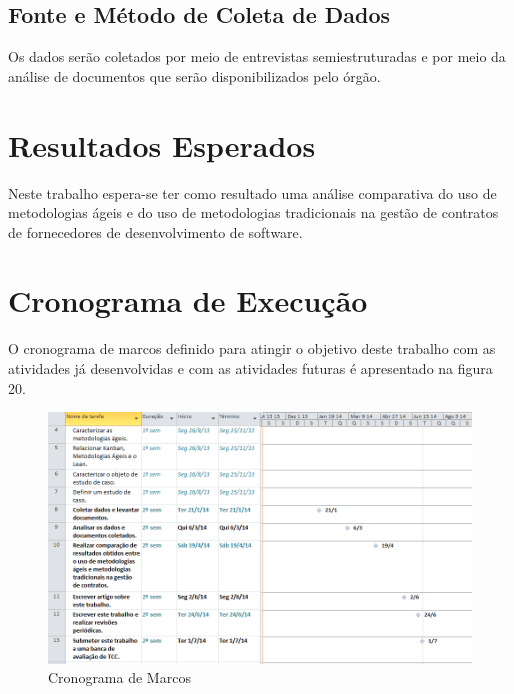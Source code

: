 \subsection[Fonte e Método Coleta de Dados]{Fonte e Método de Coleta de Dados}

Os dados serão coletados por meio de entrevistas semiestruturadas e por meio da análise de documentos que serão disponibilizados pelo órgão.

\section[Resultados Esperados]{Resultados Esperados}

Neste trabalho espera-se ter como resultado uma análise comparativa do uso de metodologias ágeis e do uso de metodologias tradicionais na gestão de contratos de fornecedores de desenvolvimento de software.

\section[Cronograma de Execução]{Cronograma de Execução}

O cronograma de marcos definido para atingir o objetivo deste trabalho com as atividades já desenvolvidas e com as atividades futuras é apresentado na figura 20.

\begin{figure}[h]
		\centering
		\label{fig02}
			\includegraphics[scale=0.6]{figuras/cronograma2.png}
		\caption{Cronograma de Marcos}
\end{figure}
